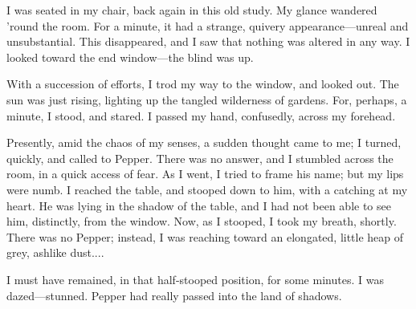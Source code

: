 
\clearpage
\label{ch:17}

\begin{ChapterStart}
\null\null
{}
\end{ChapterStart}

I was seated in my chair, back again in this old study. My glance wandered ’round the room. For a minute, it had a strange, quivery appearance---unreal and unsubstantial. This disappeared, and I saw that nothing was altered in any way. I looked toward the end window---the blind was up.

With a succession of efforts, I trod my way to the window, and looked out. The sun was just rising, lighting up the tangled wilderness of gardens. For, perhaps, a minute, I stood, and stared. I passed my hand, confusedly, across my forehead.

Presently, amid the chaos of my senses, a sudden thought came to me; I turned, quickly, and called to Pepper. There was no answer, and I stumbled across the room, in a quick access of fear. As I went, I tried to frame his name; but my lips were numb. I reached the table, and stooped down to him, with a catching at my heart. He was lying in the shadow of the table, and I had not been able to see him, distinctly, from the window. Now, as I stooped, I took my breath, shortly. There was no Pepper; instead, I was reaching toward an elongated, little heap of grey, ashlike dust....

I must have remained, in that half-stooped position, for some minutes. I was dazed---stunned. Pepper had really passed into the land of shadows.

\clearpage

